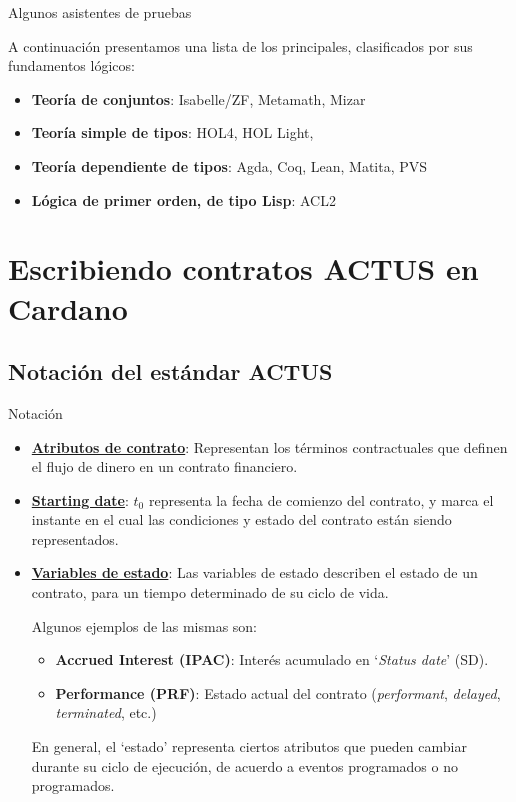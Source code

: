 \documentclass{beamer}
\makeatletter
\let\HL\hl
\renewcommand\hl{%
  \let\set@color\beamerorig@set@color
  \let\reset@color\beamerorig@reset@color
  \HL}
\newcommand{\nologo}{\setbeamertemplate{logo}{}} %
\makeatother
\begin{document}
\begin{frame}{Algunos asistentes de pruebas}

A continuación presentamos una lista de los principales, clasificados por sus fundamentos lógicos:
\vfill
\pause

\begin{itemize}
    \item \textbf{Teoría de conjuntos}: Isabelle/ZF, Metamath, Mizar
    \item \textbf{Teoría simple de tipos}: HOL4, HOL Light, \only<3>{\hl{Isabelle/HOL}}
    \item \textbf{Teoría dependiente de tipos}: Agda, Coq, Lean, Matita, PVS
    \item \textbf{Lógica de primer orden, de tipo Lisp}: ACL2
\end{itemize}
\end{frame}

\section{Escribiendo contratos ACTUS en Cardano}

\subsection{Notación del estándar ACTUS}

{\nologo
\begin{frame}{Notación}
\begin{itemize}
    \item \textbf{\underline{Atributos de contrato}}: Representan los términos contractuales que definen el flujo de dinero en un contrato financiero.
    \pause
\item \textbf{\underline{Starting date}}: $t_0$ representa la fecha de comienzo del contrato, y marca el instante en el cual las condiciones y estado del contrato están siendo representados. 
    \pause
    \item \textbf{\underline{Variables de estado}}: Las variables de estado describen el estado de un contrato, para un tiempo determinado de su ciclo de vida. 

        Algunos ejemplos de las mismas son: 
        \pause
            \begin{itemize}
                \item \textbf{Accrued Interest (IPAC)}: Interés acumulado en `\textit{Status date}' (SD).
                \item \textbf{Performance (PRF)}: Estado actual del contrato (\textit{performant}, \textit{delayed}, \textit{terminated}, etc.)
            \end{itemize}
        \pause
        En general, el ‘estado’ representa ciertos atributos que pueden cambiar durante su ciclo de ejecución, de acuerdo a eventos programados o no programados. 
\end{itemize}
\end{frame}
}
\end{document}
